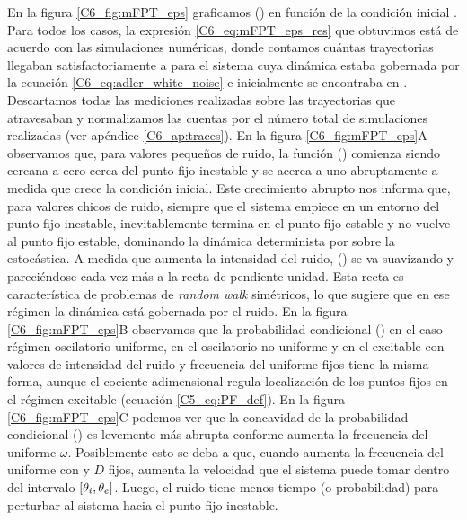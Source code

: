 \documentclass[./main.tex]{subfiles}
\begin{document}
En la figura \ref{C6_fig:mFPT_eps} graficamos \epsplus(\xx) en función de la condición inicial \xx. Para todos los casos, la expresión \ref{C6_eq:mFPT_eps_res} que obtuvimos está de acuerdo con las simulaciones numéricas, donde contamos cuántas trayectorias llegaban satisfactoriamente a \xxe para el sistema cuya dinámica estaba gobernada por la ecuación \ref{C6_eq:adler_white_noise} e inicialmente se encontraba en \xx. Descartamos todas las mediciones realizadas sobre las trayectorias que atravesaban \xxi y normalizamos las cuentas por el número total de simulaciones realizadas (ver apéndice \ref{C6_ap:traces}). En la figura \ref{C6_fig:mFPT_eps}A observamos que, para valores pequeños de ruido, la función \epsplus(\xx) comienza siendo cercana a cero cerca del punto fijo inestable y se acerca a uno abruptamente a medida que crece la condición inicial. Este crecimiento abrupto nos informa que, para valores chicos de ruido, siempre que el sistema empiece en un entorno del punto fijo inestable, inevitablemente termina en el punto fijo estable y no vuelve al punto fijo estable, dominando la dinámica determinista por sobre la estocástica. A medida que aumenta la intensidad del ruido, \epsplus(\xx) se va suavizando y pareciéndose cada vez más a la recta de pendiente unidad. Esta recta es característica de problemas de \textit{random walk} simétricos, lo que sugiere que en ese régimen la dinámica está gobernada por el ruido. En la figura \ref{C6_fig:mFPT_eps}B observamos que la probabilidad condicional \epsplus(\xx) en el caso régimen oscilatorio uniforme, en el oscilatorio no-uniforme y en el excitable con valores de intensidad del ruido y frecuencia del uniforme fijos tiene la misma forma, aunque el cociente adimensional \dddelta regula localización de los puntos fijos en el régimen excitable (ecuación \ref{C5_eq:PF_def}). En la figura  \ref{C6_fig:mFPT_eps}C podemos ver que la concavidad de la probabilidad condicional \epsplus(\xx) es levemente más abrupta conforme aumenta la frecuencia del uniforme $\omega$. Posiblemente esto se deba a que, cuando aumenta la frecuencia del uniforme con \dddelta y $D$ fijos, aumenta la velocidad que el sistema puede tomar dentro del intervalo $[\theta_i,\theta_e]$. Luego, el ruido tiene menos tiempo (o probabilidad) para perturbar al sistema hacia el punto fijo inestable. 
\end{document}
